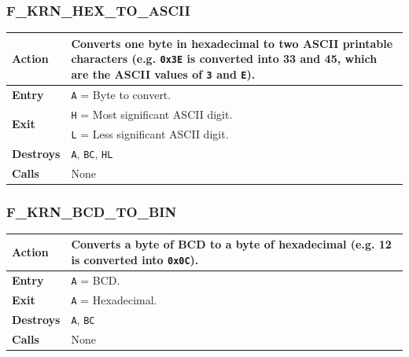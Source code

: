 \documentclass[a4paper,11pt]{article}
\begin{document}
        \subsubsection{F\_KRN\_HEX\_TO\_ASCII}
        \label{func:fkrnhextoascii}
        \begin{tabular}{l p{9cm}}
            \hline\textbf{Action}
            & Converts one byte in hexadecimal to two ASCII printable characters
            (e.g. \texttt{0x3E} is converted into 33 and 45, which are the ASCII
            values of \texttt{3} and \texttt{E}).\\
            \hline\textbf{Entry} & \texttt{A} = Byte to convert.\\
            \hline\multirow[t]{2}{4em}{\textbf{Exit}}
            & \texttt{H} = Most significant ASCII digit.\\
            & \texttt{L} = Less significant ASCII digit.\\
            \hline\textbf{Destroys} & \texttt{A}, \texttt{BC}, \texttt{HL}\\
            \hline\textbf{Calls} & None\\
            \hline
        \end{tabular}

        \subsubsection{F\_KRN\_BCD\_TO\_BIN}
        \label{func:fkrnbcdtobin}
        \begin{tabular}{l p{9cm}}
            \hline\textbf{Action}
            & Converts a byte of BCD to a byte of hexadecimal
            (e.g. 12 is converted into \texttt{0x0C}).\\
            \hline\textbf{Entry} & \texttt{A} = BCD.\\
            \hline\textbf{Exit} & \texttt{A} = Hexadecimal.\\
            \hline\textbf{Destroys} & \texttt{A}, \texttt{BC}\\
            \hline\textbf{Calls} & None\\
            \hline
        \end{tabular}
\end{document}
